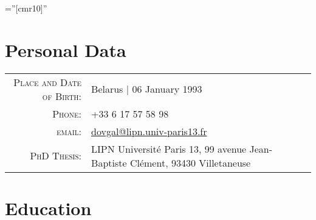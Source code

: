 \documentclass[a4paper,10pt]{article} %
\begin{document}
\pagestyle{empty} %

\font\fb=''[cmr10]'' %

\vfill


\par{\bigskip\par} %

\vfill

\section{Personal Data}

\begin{tabular}{rl}
\textsc{Place and Date of Birth:}     & Belarus  | 06 January 1993 \\
\textsc{Phone:} & +33 6 17 57 58 98 \\
\textsc{email:} &
\href{mailto:dovgal@lipn.univ-paris13.fr}{dovgal@lipn.univ-paris13.fr} \\
\textsc{PhD Thesis:} & LIPN Université Paris 13, 99 avenue
Jean-Baptiste Clément, 93430 Villetaneuse
\end{tabular}

\vfill


\section{Education}
\end{document}
